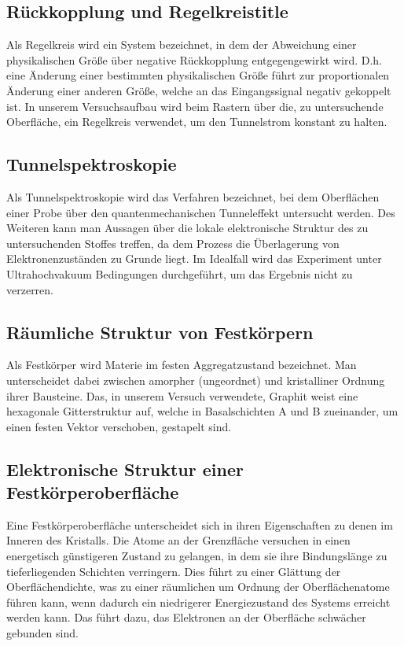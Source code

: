\documentclass[10pt,a4paper]{article}
\begin{document}
\subsection{	Rückkopplung und Regelkreistitle}

Als Regelkreis wird ein System bezeichnet, in dem der Abweichung einer physikalischen Größe über negative Rückkopplung entgegengewirkt wird. D.h. eine Änderung einer bestimmten physikalischen Größe führt zur proportionalen Änderung einer anderen Größe, welche an das Eingangssignal negativ gekoppelt ist. In unserem Versuchsaufbau wird beim Rastern über die, zu untersuchende Oberfläche, ein Regelkreis verwendet, um den Tunnelstrom konstant zu halten.

\subsection{	Tunnelspektroskopie}

Als Tunnelspektroskopie wird das Verfahren bezeichnet, bei dem Oberflächen einer Probe über den quantenmechanischen Tunneleffekt untersucht werden. Des Weiteren kann man Aussagen über die lokale elektronische Struktur des zu untersuchenden Stoffes treffen, da dem Prozess die Überlagerung von Elektronenzuständen zu Grunde liegt. Im Idealfall wird das Experiment unter Ultrahochvakuum Bedingungen durchgeführt, um das Ergebnis nicht zu verzerren.

\subsection{	Räumliche Struktur von Festkörpern}

Als Festkörper wird Materie im festen Aggregatzustand bezeichnet. Man unterscheidet dabei zwischen amorpher (ungeordnet) und kristalliner Ordnung ihrer Bausteine. Das, in unserem Versuch verwendete, Graphit weist eine hexagonale Gitterstruktur auf, welche in Basalschichten A und B zueinander, um einen festen Vektor verschoben, gestapelt sind. 

\subsection{	Elektronische Struktur einer Festkörperoberfläche}

Eine Festkörperoberfläche unterscheidet sich in ihren Eigenschaften zu denen im Inneren des Kristalls. Die Atome an der Grenzfläche versuchen in einen energetisch günstigeren Zustand zu gelangen, in dem sie ihre Bindungslänge zu tieferliegenden Schichten verringern. Dies führt zu einer Glättung der Oberflächendichte, was zu einer räumlichen um Ordnung der Oberflächenatome führen kann, wenn dadurch ein niedrigerer Energiezustand des Systems erreicht werden kann. Das führt dazu, das Elektronen an der Oberfläche schwächer gebunden sind.
\end{document}
